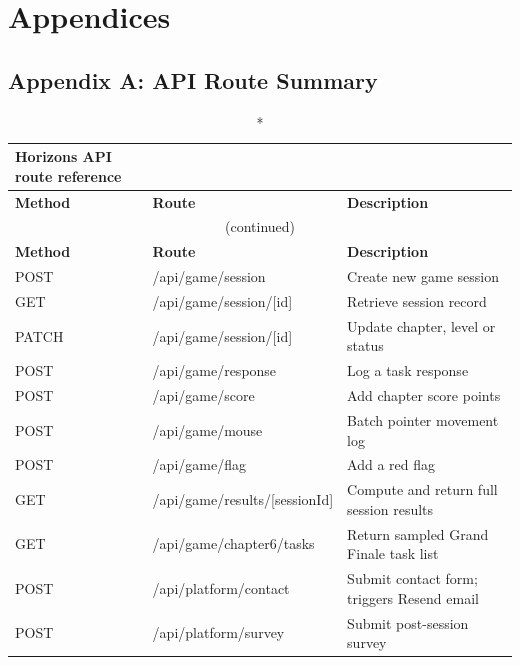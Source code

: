 \documentclass[12pt,a4paper,oneside]{report}
\renewcommand{\thechapter}{\Roman{chapter}}
\begin{document}
\clearpage
\appendix
\chapter*{Appendices}
\setcounter{chapter}{1}
\renewcommand{\thechapter}{\Alph{chapter}}
\setcounter{section}{0}

\section*{Appendix A: API Route Summary}

\begin{longtable}{llp{6cm}}
  \caption*{Horizons API route reference}\\
  \toprule
  \textbf{Method} & \textbf{Route} & \textbf{Description} \\
  \midrule
  \endfirsthead
  \multicolumn{3}{c}{\small(continued)}\\
  \toprule
  \textbf{Method} & \textbf{Route} & \textbf{Description} \\
  \midrule
  \endhead
  POST     & /api/game/session                    & Create new game session \\
  GET      & /api/game/session/[id]               & Retrieve session record \\
  PATCH    & /api/game/session/[id]               & Update chapter, level or status \\
  POST     & /api/game/response                   & Log a task response \\
  POST     & /api/game/score                      & Add chapter score points \\
  POST     & /api/game/mouse                      & Batch pointer movement log \\
  POST     & /api/game/flag                       & Add a red flag \\
  GET      & /api/game/results/[sessionId]        & Compute and return full session results \\
  GET      & /api/game/chapter6/tasks             & Return sampled Grand Finale task list \\
  POST     & /api/platform/contact                & Submit contact form; triggers Resend email \\
  POST     & /api/platform/survey                 & Submit post-session survey \\

\end{longtable}
\end{document}
